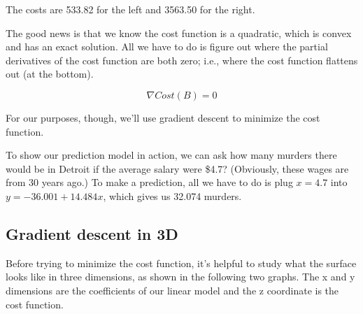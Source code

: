 \begin{fullwidth}
\noindent The costs are 533.82 for the left and 3563.50 for the right.

The good news is that we know the cost function is a quadratic, which is convex and has an exact solution. All we have to do is figure out where the partial derivatives of the cost function are both zero; i.e., where the cost function flattens out (at the bottom).

\[\tag{Analytic solution to optimization}
\nabla Cost(B) = 0
\]

\noindent For our purposes, though, we'll use gradient descent to minimize the cost function.

To show our prediction model in action, we can ask how many murders  there would be in Detroit if the average salary were \$4.7? (Obviously, these wages are from 30 years ago.) To make a prediction, all we have to do is plug $x=4.7$ into $y = -36.001 + 14.484 x$, which gives us 32.074 murders.

\subsection{Gradient descent in 3D}

Before trying to minimize the cost function, it's helpful to study what the surface looks like in three dimensions, as shown in the following two graphs. The x and y dimensions are the coefficients of our linear model and the z coordinate is the cost function.


\end{fullwidth}
